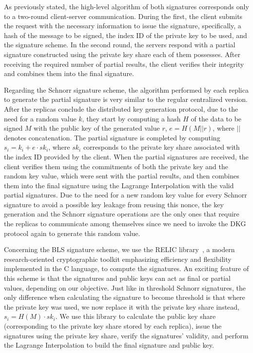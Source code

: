 As previously stated, the high-level algorithm of both signatures corresponds only to a two-round client-server communication. During the first, the client submits the request with the necessary information to issue the signature, specifically, a hash of the message to be signed, the index ID of the private key to be used, and the signature scheme. In the second round, the servers respond with a partial signature constructed using the private key share each of them possesses. After receiving the required number of partial results, the client verifies their integrity and combines them into the final signature.

Regarding the Schnorr signature scheme, the algorithm performed by each replica to generate the partial signature is very similar to the regular centralized version. After the replicas conclude the distributed key generation protocol, due to the need for a random value $k$, they start by computing a hash $H$ of the data to be signed $M$ with the public key of the generated value $r$, $e=H(M || r)$, where $||$ denotes concatenation. The partial signature is completed by computing $s_i=k_i + e \cdot sk_i$, where $sk_i$ corresponds to the private key share associated with the index ID provided by the client. When the partial signatures are received, the client verifies them using the commitments of both the private key and the random key value, which were sent with the partial results, and then combines them into the final signature using the Lagrange Interpolation with the valid partial signatures. Due to the need for a new random key value for every Schnorr signature to avoid a possible key leakage from reusing this nonce, the key generation and the Schnorr signature operations are the only ones that require the replicas to communicate among themselves since we need to invoke the DKG protocol again to generate this random value.

Concerning the BLS signature scheme, we use the RELIC library~\cite{relicgithub}, a modern research-oriented cryptographic toolkit emphasizing efficiency and flexibility implemented in the C language, to compute the signatures. An exciting feature of this scheme is that the signatures and public keys can act as final or partial values, depending on our objective. Just like in threshold Schnorr signatures, the only difference when calculating the signature to become threshold is that where the private key was used, we now replace it with the private key share instead, $s_i=H(M) \cdot sk_i$. We use this library to calculate the public key share (corresponding to the private key share stored by each replica), issue the signatures using the private key share, verify the signatures' validity, and perform the Lagrange Interpolation to build the final signature and public key.



